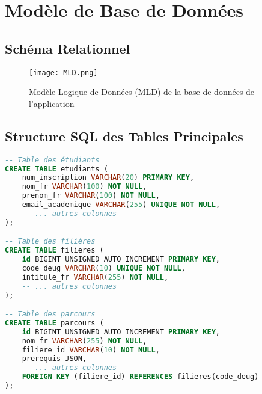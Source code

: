 \documentclass[12pt,a4paper]{report}
\begin{document}
\chapter{Modèle de Base de Données}

\section{Schéma Relationnel}
\begin{figure}[H]
    \centering
    \texttt{[image: MLD.png]}
    \caption{Modèle Logique de Données (MLD) de la base de données de l'application}
    \label{fig:mld_annexe}
\end{figure}





\section{Structure SQL des Tables Principales}


\begin{lstlisting}[language=SQL]
-- Table des étudiants
CREATE TABLE etudiants (
    num_inscription VARCHAR(20) PRIMARY KEY,
    nom_fr VARCHAR(100) NOT NULL,
    prenom_fr VARCHAR(100) NOT NULL,
    email_academique VARCHAR(255) UNIQUE NOT NULL,
    -- ... autres colonnes
);

-- Table des filières
CREATE TABLE filieres (
    id BIGINT UNSIGNED AUTO_INCREMENT PRIMARY KEY,
    code_deug VARCHAR(10) UNIQUE NOT NULL,
    intitule_fr VARCHAR(255) NOT NULL,
    -- ... autres colonnes
);

-- Table des parcours
CREATE TABLE parcours (
    id BIGINT UNSIGNED AUTO_INCREMENT PRIMARY KEY,
    nom_fr VARCHAR(255) NOT NULL,
    filiere_id VARCHAR(10) NOT NULL,
    prerequis JSON,
    -- ... autres colonnes
    FOREIGN KEY (filiere_id) REFERENCES filieres(code_deug)
);
\end{lstlisting}
\end{document}
